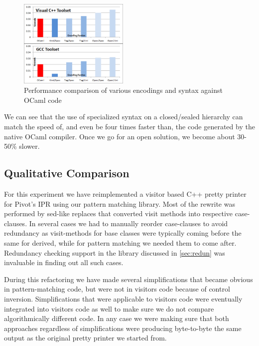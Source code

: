 \documentclass[preprint]{sigplanconf}
\begin{document}
\begin{figure}[htbp]
  \centering
    \includegraphics[width=0.47\textwidth]{OCamlComparison.png}
  \caption{Performance comparison of various encodings and syntax against OCaml code}
  \label{fig:OCamlComparison}
\end{figure}

We can see that the use of specialized syntax on a closed/sealed hierarchy can 
match the speed of, and even be four times faster than, the code generated by 
the native OCaml compiler. Once we go for an open solution, we become about 
30-50\% slower. 

\subsection{Qualitative Comparison}
\label{sec:qualcmp}

For this experiment we have reimplemented a visitor based C++ pretty printer for 
Pivot's IPR using our pattern matching library. Most of the rewrite was 
performed by sed-like replaces that converted visit methods into respective 
case-clauses. In several cases we had to manually reorder case-clauses to avoid 
redundancy as visit-methods for base classes were typically coming before the 
same for derived, while for pattern matching we needed them to come after. 
Redundancy checking support in the library discussed in \textsection\ref{sec:redun}
was invaluable in finding out all such cases.

During this refactoring we have made several simplifications that became obvious 
in pattern-matching code, but were not in visitors code because of control 
inversion. Simplifications that were applicable to visitors code were eventually 
integrated into visitors code as well to make sure we do not compare 
algorithmically different code. In any case we were making sure that both 
approaches regardless of simplifications were producing byte-to-byte the same 
output as the original pretty printer we started from.
\end{document}
